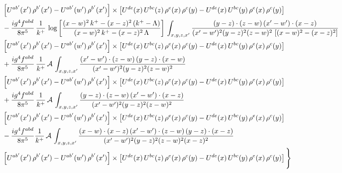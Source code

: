 \documentclass[9pt]{article}
\numberwithin{equation}{section}
\begin{document}
\begin{align}
& \left[U^{ab'}(x')\,\rho^{b'}(x')-U^{ab'}(w')\, \rho^{b'}(x')\right]\times \left[U^{de}(x)\,U^{bc}(z)\, \rho^{e}(x)\,\rho^{c}(y)-U^{de}(x)\,U^{bc}(y)\,\rho^{e}(x)\,\rho^{c}(y)\right]\notag \\ & -\frac{ig^{4}f^{abd}}{8\pi^{5}}\,\frac{1}{k^{+}}\,\log{\left[\frac{(x-w)^{2}\,k^{+}-(x-z)^{2}\,(k^{+}-\Lambda)}{(x-w)^{2}\,k^{+}-(x-z)^{2}\,\Lambda}\right]}\,\int_{x,y,z,x'}
\frac{(y-z)\cdot(z-w)\,(x'-w')\cdot(x-z)}{(x'-w')^{2}(y-z)^{2}(z-w)^{2}\,\left[(x-w)^{2}-(x-z)^{2}\right]}\notag \\ & \left[U^{ab'}(x')\,\rho^{b'}(x')-U^{ab'}(w')\, \rho^{b'}(x')\right]\times \left[U^{de}(x)\,U^{bc}(z)\, \rho^{e}(x)\,\rho^{c}(y)-U^{de}(x)\,U^{bc}(y)\,\rho^{e}(x)\,\rho^{c}(y)\right]\notag \\ & +\frac{ig^{4}f^{abd}}{8\pi^{5}}\,\frac{1}{k^{+}}\,\mathcal{A}\,\int_{x,y,z,x'}
\frac{(x'-w')\cdot(z-w)\,(y-z)\cdot(x-w)}{(x'-w')^{2}(y-z)^{2}(z-w)^{2}}\notag \\
& \left[U^{ab'}(x')\,\rho^{b'}(x')-U^{ab'}(w')\, \rho^{b'}(x')\right]\times \left[U^{de}(x)\,U^{bc}(z)\, \rho^{e}(x)\,\rho^{c}(y)-U^{de}(x)\,U^{bc}(y)\,\rho^{e}(x)\,\rho^{c}(y)\right]\notag \\ & +\frac{ig^{4}f^{abd}}{8\pi^{5}}\,\frac{1}{k^{+}}\,\mathcal{A}\,\int_{x,y,z,x'}
\frac{(y-z)\cdot(z-w)\,(x'-w')\cdot(x-z)}{(x'-w')^{2}(y-z)^{2}(z-w)^{2}}\notag \\ & \left[U^{ab'}(x')\,\rho^{b'}(x')-U^{ab'}(w')\, \rho^{b'}(x')\right]\times \left[U^{de}(x)\,U^{bc}(z)\, \rho^{e}(x)\,\rho^{c}(y)-U^{de}(x)\,U^{bc}(y)\,\rho^{e}(x)\,\rho^{c}(y)\right]\notag \\ & -\frac{ig^{4}f^{abd}}{8\pi^{5}}\frac{1}{k^{+}}\,\mathcal{A}\,\int_{x,y,z,x'}
\frac{(x-w)\cdot(x-z)\,(x'-w')\cdot(z-w)\,(y-z)\cdot(x-z)}{(x'-w')^{2}(y-z)^{2}(z-w)^{2}(x-z)^{2}}\notag \\ & \left[U^{ab'}(x')\,\rho^{b'}(x')-U^{ab'}(w')\, \rho^{b'}(x')\right]\times \left[U^{de}(x)\,U^{bc}(z)\, \rho^{e}(x)\,\rho^{c}(y)-U^{de}(x)\,U^{bc}(y)\,\rho^{e}(x)\,\rho^{c}(y)\right]\Bigg\}
\end{align}
\end{document}
